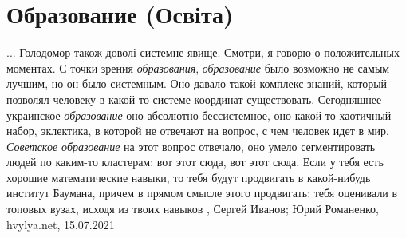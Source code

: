  
 
 
 
 
\chapter{Образование (Освіта)}
\label{sec:slova.obrazovanie.osvita}

... Голодомор також доволі системне явище.  Смотри, я говорю о положительных
моментах. С точки зрения \emph{образования}, \emph{образование} было возможно не самым
лучшим, но он было системным. Оно давало такой комплекс знаний, который
позволял человеку в какой-то системе координат существовать. Сегодняшнее
украинское \emph{образование} оно абсолютно бессистемное, оно какой-то хаотичный
набор, эклектика, в которой не отвечают на вопрос, с чем человек идет в мир.
\emph{Советское образование} на этот вопрос отвечало, оно умело сегментировать людей
по каким-то кластерам: вот этот сюда, вот этот сюда. Если у тебя есть хорошие
математические навыки, то тебя будут продвигать в какой-нибудь институт
Баумана, причем в прямом смысле этого продвигать: тебя оценивали в топовых
вузах, исходя из твоих навыков
, 
Сергей Иванов; Юрий Романенко, hvylya.net, 15.07.2021

